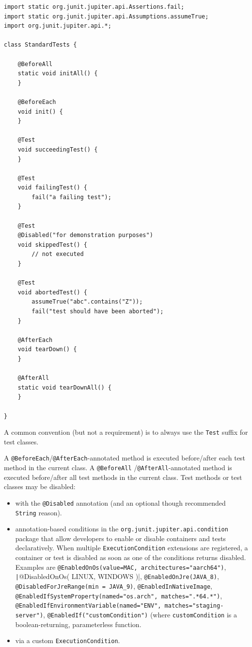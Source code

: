 \documentclass[table, xcdraw]{article}%
\begin{document}
\begin{verbatim}
import static org.junit.jupiter.api.Assertions.fail;
import static org.junit.jupiter.api.Assumptions.assumeTrue;
import org.junit.jupiter.api.*;

class StandardTests {

    @BeforeAll
    static void initAll() {
    }

    @BeforeEach
    void init() {
    }

    @Test
    void succeedingTest() {
    }

    @Test
    void failingTest() {
        fail("a failing test");
    }

    @Test
    @Disabled("for demonstration purposes")
    void skippedTest() {
        // not executed
    }

    @Test
    void abortedTest() {
        assumeTrue("abc".contains("Z"));
        fail("test should have been aborted");
    }

    @AfterEach
    void tearDown() {
    }

    @AfterAll
    static void tearDownAll() {
    }

}
\end{verbatim}

A common convention (but not a requirement) is to always use the \texttt{Test} suffix for test classes.

A \texttt{@BeforeEach}/\texttt{@AfterEach}-annotated method is executed before/after each test method in the current class. A \texttt{@BeforeAll} /\texttt{@AfterAll}-annotated method is executed before/after all test methods in the current class. Test methods or test classes may be disabled:

\begin{itemize}
    \item with the \texttt{@Disabled} annotation (and an optional though recommended \texttt{String} reason).
    \item annotation-based conditions in the \texttt{org.junit.jupiter.api.condition} package that allow developers to enable or disable containers and tests declaratively. When multiple \texttt{ExecutionCondition} extensions are registered, a container or test is disabled as soon as one of the conditions returns disabled. Examples are \texttt{@EnabledOnOs(value=MAC, architectures="aarch64")}, \texttt|@DisabledOnOs({ LINUX, WINDOWS })|, \texttt{@EnabledOnJre(JAVA_8)}, \texttt{@DisabledForJreRange(min = JAVA_9)}, \texttt{@EnabledInNativeImage}, \texttt{@EnabledIfSystemProperty(named="os.arch", matches=".*64.*")},\\\texttt{@EnabledIfEnvironmentVariable(named="ENV", matches="staging-server")}, \texttt{@EnabledIf("customCondition")} (where \texttt{customCondition} is a boolean-returning, parameterless function.
    \item via a custom \texttt{ExecutionCondition}.
\end{itemize}
\end{document}
